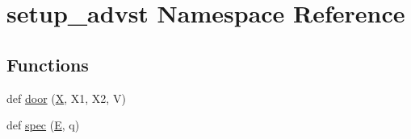 \hypertarget{namespacesetup__advst}{}\section{setup\+\_\+advst Namespace Reference}
\label{namespacesetup__advst}
\subsection*{Functions}
\begin{DoxyCompactItemize}
\item 
def \hyperlink{namespacesetup__advst_a5ca2de035f76d55b884417b6ed9191d4}{door} (\hyperlink{namespacesetup__advst_a4fe22219bfc7363b6decb33a0885e17a}{X}, X1, X2, V)
\item 
def \hyperlink{namespacesetup__advst_a6338d51baec2fdf3b904fa36fd169e5d}{spec} (\hyperlink{namespacesetup__advst_a846b33b3abeae0f60876a6d51bb0ae79}{E}, q)
\end{DoxyCompactItemize}
